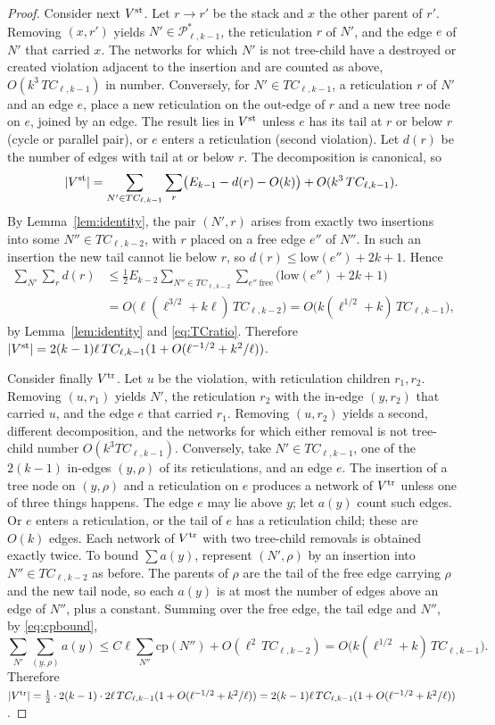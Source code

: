 \documentclass[11pt,a4paper]{article}
\theoremstyle{definition}
\newcommand{\cP}{\mathcal{P}}
\begin{document}
\begin{proof}
Consider next $V^{\rm st}$. Let $r\to r'$ be the stack and $x$ the other parent of $r'$. Removing $(x,r')$ yields $N'\in\cP^*_{\ell,k-1}$, the reticulation $r$ of $N'$, and the edge $e$ of $N'$ that carried $x$. The networks for which $N'$ is not tree-child have a destroyed or created violation adjacent to the insertion and are counted as above, $O(k^3\,TC_{\ell,k-1})$ in number. Conversely, for $N'\in TC_{\ell,k-1}$, a reticulation $r$ of $N'$ and an edge $e$, place a new reticulation on the out-edge of $r$ and a new tree node on $e$, joined by an edge. The result lies in $V^{\rm st}$ unless $e$ has its tail at $r$ or below $r$ (cycle or parallel pair), or $e$ enters a reticulation (second violation). Let $d(r)$ be the number of edges with tail at or below $r$. The decomposition is canonical, so
\[
|V^{\rm st}|=\sum_{N'\in TC_{\ell,k-1}}\sum_r\bigl(E_{k-1}-d(r)-O(k)\bigr)+O(k^3\,TC_{\ell,k-1}).
\]
By Lemma~\ref{lem:identity}, the pair $(N',r)$ arises from exactly two insertions into some $N''\in TC_{\ell,k-2}$, with $r$ placed on a free edge $e''$ of $N''$. In such an insertion the new tail cannot lie below $r$, so $d(r)\le\mathrm{low}(e'')+2k+1$. Hence
\begin{align*}
\sum_{N'}\sum_rd(r)&\le\tfrac12E_{k-2}\sum_{N''\in TC_{\ell,k-2}}\sum_{e''\ \mathrm{free}}\bigl(\mathrm{low}(e'')+2k+1\bigr)\\
&=O\bigl(\ell(\ell^{3/2}+k\ell)\,TC_{\ell,k-2}\bigr)=O\bigl(k(\ell^{1/2}+k)\,TC_{\ell,k-1}\bigr),
\end{align*}
by Lemma~\ref{lem:identity} and \eqref{eq:TCratio}. Therefore $|V^{\rm st}|=2(k-1)\ell\,TC_{\ell,k-1}(1+O(\ell^{-1/2}+k^2/\ell))$.

Consider finally $V^{\rm tr}$. Let $u$ be the violation, with reticulation children $r_1,r_2$. Removing $(u,r_1)$ yields $N'$, the reticulation $r_2$ with the in-edge $(y,r_2)$ that carried $u$, and the edge $e$ that carried $r_1$. Removing $(u,r_2)$ yields a second, different decomposition, and the networks for which either removal is not tree-child number $O(k^3TC_{\ell,k-1})$. Conversely, take $N'\in TC_{\ell,k-1}$, one of the $2(k-1)$ in-edges $(y,\rho)$ of its reticulations, and an edge $e$. The insertion of a tree node on $(y,\rho)$ and a reticulation on $e$ produces a network of $V^{\rm tr}$ unless one of three things happens. The edge $e$ may lie above $y$; let $a(y)$ count such edges. Or $e$ enters a reticulation, or the tail of $e$ has a reticulation child; these are $O(k)$ edges. Each network of $V^{\rm tr}$ with two tree-child removals is obtained exactly twice. To bound $\sum a(y)$, represent $(N',\rho)$ by an insertion into $N''\in TC_{\ell,k-2}$ as before. The parents of $\rho$ are the tail of the free edge carrying $\rho$ and the new tail node, so each $a(y)$ is at most the number of edges above an edge of $N''$, plus a constant. Summing over the free edge, the tail edge and $N''$, by \eqref{eq:cpbound},
\[
\sum_{N'}\sum_{(y,\rho)}a(y)\le C\ell\sum_{N''}\mathrm{cp}(N'')+O(\ell^2\,TC_{\ell,k-2})=O\bigl(k(\ell^{1/2}+k)\,TC_{\ell,k-1}\bigr).
\]
Therefore $|V^{\rm tr}|=\frac12\cdot2(k-1)\cdot2\ell\,TC_{\ell,k-1}(1+O(\ell^{-1/2}+k^2/\ell))=2(k-1)\ell\,TC_{\ell,k-1}(1+O(\ell^{-1/2}+k^2/\ell))$.


\end{proof}
\end{document}
